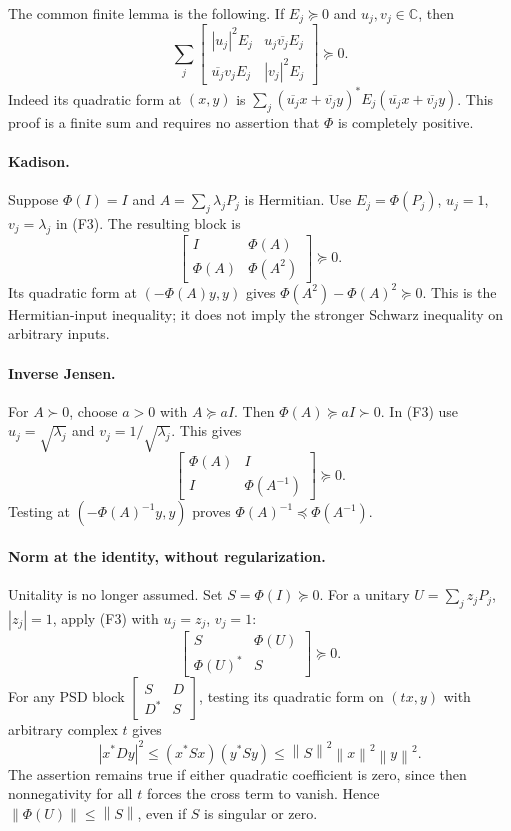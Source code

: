 \documentclass[11pt,a4paper]{article}
\newcommand{\C}{\mathbb C}
\newcommand{\norm}[1]{\left\lVert#1\right\rVert}
\begin{document}
The common finite lemma is the following. If $E_j\succeq0$ and $u_j,v_j\in\C$,
then
\[
 \sum_j\begin{bmatrix}|u_j|^2E_j&u_j\overline{v_j}E_j\\
 \overline{u_j}v_jE_j&|v_j|^2E_j\end{bmatrix}\succeq0.             \tag{F3}
\]
Indeed its quadratic form at $(x,y)$ is
$\sum_j(\overline{u_j}x+\overline{v_j}y)^*
 E_j(\overline{u_j}x+\overline{v_j}y)$. This proof is a finite sum and
requires no assertion that $\Phi$ is completely positive.

\paragraph{Kadison.}
Suppose $\Phi(I)=I$ and $A=\sum_j\lambda_jP_j$ is Hermitian. Use
$E_j=\Phi(P_j)$, $u_j=1$, $v_j=\lambda_j$ in (F3). The resulting block is
\[
                 \begin{bmatrix}I&\Phi(A)\\\Phi(A)&\Phi(A^2)\end{bmatrix}
                 \succeq0.
\]
Its quadratic form at $(-\Phi(A)y,y)$ gives
$\Phi(A^2)-\Phi(A)^2\succeq0$. This is the Hermitian-input inequality;
it does not imply the stronger Schwarz inequality on arbitrary inputs.

\paragraph{Inverse Jensen.}
\label{sec:positive-map-inverse-jensen}
For $A\succ0$, choose $a>0$ with $A\succeq aI$. Then
$\Phi(A)\succeq aI\succ0$. In (F3) use
$u_j=\sqrt{\lambda_j}$ and $v_j=1/\sqrt{\lambda_j}$. This gives
\[
                 \begin{bmatrix}\Phi(A)&I\\I&\Phi(A^{-1})\end{bmatrix}
                 \succeq0.
\]
Testing at $(-\Phi(A)^{-1}y,y)$ proves
$\Phi(A)^{-1}\preceq\Phi(A^{-1})$.

\paragraph{Norm at the identity, without regularization.}
\label{sec:positive-map-norm-at-identity}
Unitality is no longer assumed. Set $S=\Phi(I)\succeq0$. For a unitary
$U=\sum_j z_jP_j$, $|z_j|=1$, apply (F3) with $u_j=z_j$, $v_j=1$:
\[
                 \begin{bmatrix}S&\Phi(U)\\\Phi(U)^*&S\end{bmatrix}
                 \succeq0.                                      \tag{F4}
\]
For any PSD block $\left[\begin{smallmatrix}S&D\\D^*&S\end{smallmatrix}\right]$,
testing its quadratic form on $(tx,y)$ with arbitrary complex $t$ gives
\[
 |x^*Dy|^2\le(x^*Sx)(y^*Sy)\le\norm S^2\norm x^2\norm y^2.
\]
The assertion remains true if either quadratic coefficient is zero, since
then nonnegativity for all $t$ forces the cross term to vanish. Hence
$\norm{\Phi(U)}\le\norm S$, even if $S$ is singular or zero.
\end{document}
